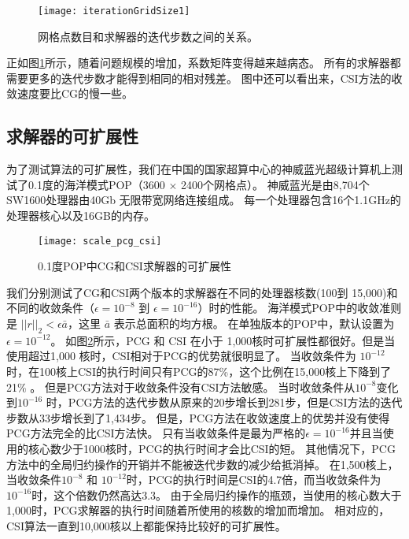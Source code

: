 \begin{figure} 
\vspace{5pt}
\centering
\texttt{[image: iterationGridSize1]}
\caption[] {网格点数目和求解器的迭代步数之间的关系。\label{fig:iterationGridSize}}
\end{figure}

正如图\ref{fig:iterationGridSize}所示，随着问题规模的增加，系数矩阵变得越来越病态。
所有的求解器都需要更多的迭代步数才能得到相同的相对残差。 
图中还可以看出来，CSI方法的收敛速度要比CG的慢一些。 



 
\subsection{求解器的可扩展性} \label{solver:exp:csi}

为了测试算法的可扩展性，我们在中国的国家超算中心的神威蓝光超级计算机上测试了0.1度的海洋模式POP（3600 $\times$ 2400个网格点）。
神威蓝光是由8,704个SW1600处理器由40Gb 无限带宽网络连接组成。
每一个处理器包含16个1.1GHz的处理器核心以及16GB的内存。 

\begin {figure}
\centering
\texttt{[image: scale\_pcg\_csi]}
\caption []{ 0.1度POP中CG和CSI求解器的可扩展性 \label {fig:scale}}
\end {figure}
我们分别测试了CG和CSI两个版本的求解器在不同的处理器核数(100到 15,000)和不同的收敛条件（$\epsilon = 10^{-8}$ 到 $\epsilon = 10^{-16}$）时的性能。
海洋模式POP中的收敛准则是 $||r||_2<\epsilon \bar{a}$，这里 $\bar{a}$ 表示总面积的均方根。 
在单独版本的POP中，默认设置为 $\epsilon = 10^{-12}$。 
如图\ref{fig:scale}所示，PCG 和 CSI 在小于  1,000核时可扩展性都很好。但是当使用超过1,000 核时，CSI相对于PCG的优势就很明显了。 
当收敛条件为 $10^{-12}$时，在100核上CSI的执行时间只有PCG的87\%，这个比例在15,000核上下降到了 21\% 。
但是PCG方法对于收敛条件没有CSI方法敏感。 
当时收敛条件从$10^{-8}$变化到$10^{-16}$ 时，PCG方法的迭代步数从原来的20步增长到281步，但是CSI方法的迭代步数从33步增长到了1,434步。 
但是，PCG方法在收敛速度上的优势并没有使得PCG方法完全的比CSI方法快。 
只有当收敛条件是最为严格的$\epsilon = 10^{-16}$并且当使用的核心数少于1000核时，PCG的执行时间才会比CSI的短。
其他情况下，PCG方法中的全局归约操作的开销并不能被迭代步数的减少给抵消掉。
在1,500核上，当收敛条件$10^{-8}$ 和 $10^{-12}$时，PCG的执行时间是CSI的4.7倍，而当收敛条件为$10^{-16}$时，这个倍数仍然高达3.3。
由于全局归约操作的瓶颈，当使用的核心数大于1,000时，PCG求解器的执行时间随着所使用的核数的增加而增加。 
相对应的，CSI算法一直到10,000核以上都能保持比较好的可扩展性。

